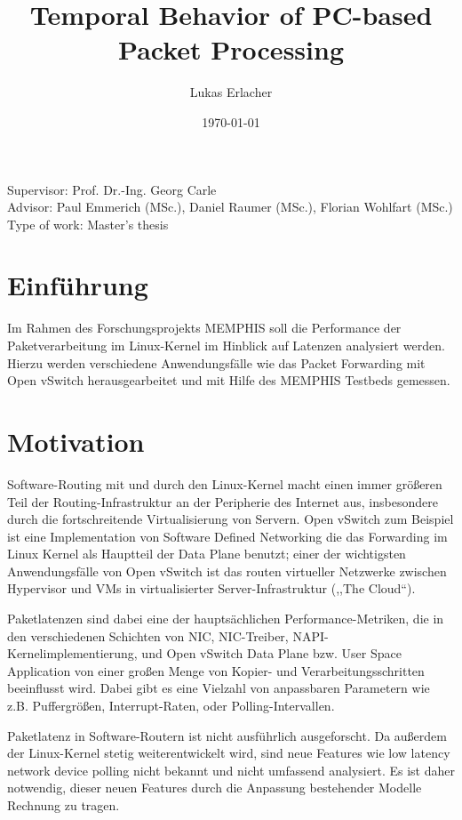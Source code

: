 \documentclass[a4paper]{article}
\title{Temporal Behavior of PC-based Packet Processing}
\date{\today}
\author{Lukas Erlacher}
\begin{document}
\maketitle
\thispagestyle{fancy}

\begin{flushleft}
Supervisor: Prof. Dr.-Ing. Georg Carle\\
Advisor: Paul Emmerich (MSc.), Daniel Raumer (MSc.), Florian Wohlfart (MSc.)\\
Type of work: Master's thesis
\end{flushleft}


\section*{Einführung}
Im Rahmen des Forschungsprojekts MEMPHIS soll die Performance der Paketverarbeitung im Linux-Kernel im Hinblick auf Latenzen analysiert werden. Hierzu werden verschiedene Anwendungsfälle wie das Packet Forwarding mit Open vSwitch herausgearbeitet und mit Hilfe des MEMPHIS Testbeds gemessen.


\section*{Motivation}
Software-Routing mit und durch den Linux-Kernel macht einen immer größeren Teil der Routing-Infrastruktur an der Peripherie des Internet aus, insbesondere durch die fortschreitende Virtualisierung von Servern. Open vSwitch zum Beispiel ist eine Implementation von Software Defined Networking die das Forwarding im Linux Kernel als Hauptteil der Data Plane benutzt; einer der wichtigsten Anwendungsfälle von Open vSwitch ist das routen virtueller Netzwerke zwischen Hypervisor und VMs in virtualisierter Server-Infrastruktur (,,The Cloud``).

Paketlatenzen sind dabei eine der hauptsächlichen Performance-Metriken, die in den verschiedenen Schichten von NIC, NIC-Treiber, NAPI-Kernelimplementierung, und Open vSwitch Data Plane bzw. User Space Application von einer großen Menge von Kopier- und Verarbeitungsschritten beeinflusst wird. Dabei gibt es eine Vielzahl von anpassbaren Parametern wie z.B. Puffergrößen, Interrupt-Raten, oder Polling-Intervallen.

Paketlatenz in Software-Routern ist nicht ausführlich ausgeforscht. Da außerdem der Linux-Kernel stetig weiterentwickelt wird, sind neue Features wie low latency network device polling nicht bekannt und nicht umfassend analysiert. Es ist daher notwendig, dieser neuen Features durch die Anpassung bestehender Modelle Rechnung zu tragen.
\end{document}
